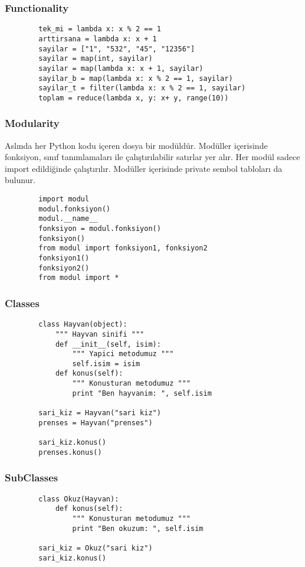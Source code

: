 \documentclass[10pt, compress]{beamer}
\begin{document}
\begin{frame}[fragile]
\frametitle{Functionality}    
    \begin{verbatim}
        tek_mi = lambda x: x % 2 == 1
        arttirsana = lambda x: x + 1
        sayilar = ["1", "532", "45", "12356"]
        sayilar = map(int, sayilar)
        sayilar = map(lambda x: x + 1, sayilar)
        sayilar_b = map(lambda x: x % 2 == 1, sayilar)
        sayilar_t = filter(lambda x: x % 2 == 1, sayilar)
        toplam = reduce(lambda x, y: x+ y, range(10))
    \end{verbatim}
\end{frame}

\begin{frame}[fragile]
\frametitle{Modularity}    
    Aslında her Python kodu içeren dosya bir modüldür. Modüller içerisinde fonksiyon, sınıf tanımlamaları ile çalıştırılabilir satırlar yer alır. Her modül sadece \alert{import} edildiğinde çalıştırılır. Modüller içerisinde \alert{private} sembol tabloları da bulunur.
    \begin{verbatim}
        import modul
        modul.fonksiyon()
        modul.__name__
        fonksiyon = modul.fonksiyon()
        fonksiyon()
        from modul import fonksiyon1, fonksiyon2
        fonksiyon1()
        fonksiyon2()
        from modul import *
    \end{verbatim}
\end{frame}

\begin{frame}[fragile]
\frametitle{Classes}    
    \begin{verbatim}
        class Hayvan(object):
            """ Hayvan sinifi """
            def __init__(self, isim):
                """ Yapici metodumuz """
                self.isim = isim
            def konus(self):
                """ Konusturan metodumuz """
                print "Ben hayvanim: ", self.isim
        
        sari_kiz = Hayvan("sari kiz")
        prenses = Hayvan("prenses")
        
        sari_kiz.konus()
        prenses.konus()
    \end{verbatim}
\end{frame}

\begin{frame}[fragile]
\frametitle{SubClasses}    
    \begin{verbatim}
        class Okuz(Hayvan):
            def konus(self):
                """ Konusturan metodumuz """
                print "Ben okuzum: ", self.isim
        
        sari_kiz = Okuz("sari kiz")
        sari_kiz.konus()
    \end{verbatim}
\end{frame}
\end{document}
